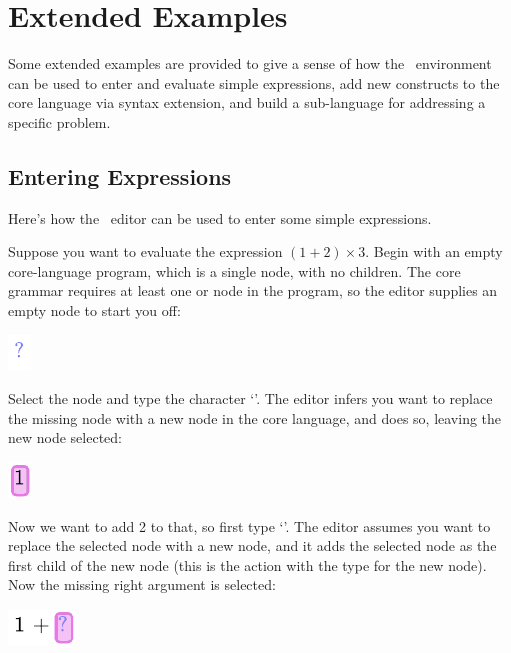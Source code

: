 \chapter{Extended Examples}
\label{examples}
Some extended examples are provided to give a sense of how the \Meta\ environment can be used to enter and evaluate simple expressions, add new constructs to the core language via syntax extension, and build a sub-language for addressing a specific problem.

\section{Entering Expressions}
Here's how the \Meta\ editor can be used to enter some simple expressions.

Suppose you want to evaluate the expression $(1+2) \times 3$. Begin with an empty core-language program, which is a single  node, with no children. The core grammar requires at least one  or  node in the program, so the editor supplies an empty node to start you off:
\begin{center}
\includegraphics{src/image/expr1.pdf}
\end{center}

Select the node and type the character `'. The editor infers you want to replace the missing node with a new  node in the core language, and does so, leaving the new node selected:
\begin{center}
\includegraphics{src/image/expr2.pdf}
\end{center}

Now we want to add 2 to that, so first type `\clojure{+}'. The editor assumes you want to replace the selected node with a new  node, and it adds the selected node as the first child of the new node (this is the  action with the type  for the new node). Now the missing right argument is selected:
\begin{center}
\includegraphics{src/image/expr3.pdf}
\end{center}

